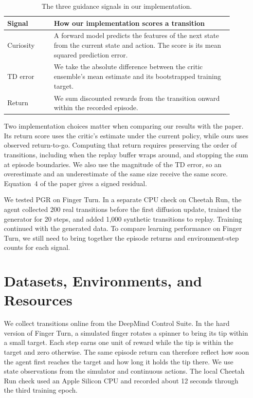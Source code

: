 \documentclass[11pt,letterpaper]{cmu}
\begin{document}
\begin{table}[ht]
\centering
\begin{tabular}{@{}p{0.19\linewidth}p{0.73\linewidth}@{}}
\toprule
Signal & How our implementation scores a transition \\
\midrule
Curiosity & A forward model predicts the features of the next state from the current state and action. The score is its mean squared prediction error. \\
TD error & We take the absolute difference between the critic ensemble's mean estimate and its bootstrapped training target. \\
Return & We sum discounted rewards from the transition onward within the recorded episode. \\
\bottomrule
\end{tabular}
\caption{The three guidance signals in our implementation.}
\end{table}

Two implementation choices matter when comparing our results with the paper. Its return score uses the critic's estimate under the current policy, while ours uses observed return-to-go. Computing that return requires preserving the order of transitions, including when the replay buffer wraps around, and stopping the sum at episode boundaries. We also use the magnitude of the TD error, so an overestimate and an underestimate of the same size receive the same score. Equation~4 of the paper gives a signed residual.

We tested PGR on Finger Turn. In a separate CPU check on Cheetah Run, the agent collected 200 real transitions before the first diffusion update, trained the generator for 20 steps, and added 1,000 synthetic transitions to replay. Training continued with the generated data. To compare learning performance on Finger Turn, we still need to bring together the episode returns and environment-step counts for each signal.

\section{Datasets, Environments, and Resources}
We collect transitions online from the DeepMind Control Suite. In the hard version of Finger Turn, a simulated finger rotates a spinner to bring its tip within a small target. Each step earns one unit of reward while the tip is within the target and zero otherwise. The same episode return can therefore reflect how soon the agent first reaches the target and how long it holds the tip there. We use state observations from the simulator and continuous actions. The local Cheetah Run check used an Apple Silicon CPU and recorded about 12 seconds through the third training epoch.
\end{document}
